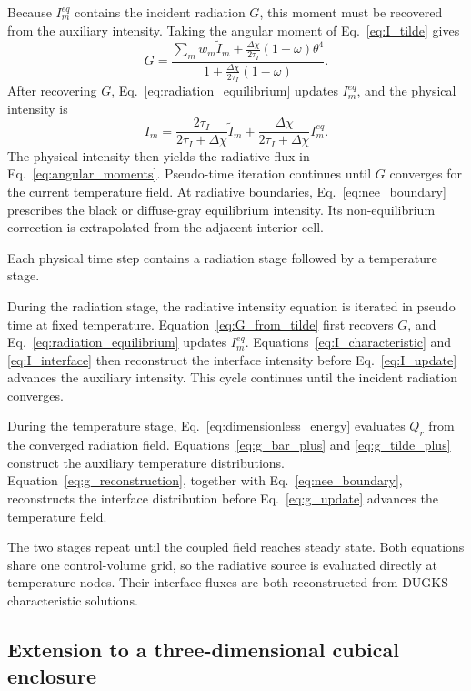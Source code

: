 \documentclass[a4paper,12pt]{ctexart}
\numberwithin{equation}{section}
\begin{document}
Because $I_m^{eq}$ contains the incident radiation $G$, this moment must be recovered from the auxiliary intensity. Taking the angular moment of Eq.~\eqref{eq:I_tilde} gives
\begin{equation}
G=\frac{\sum_m w_m\tilde I_m+\frac{\Delta\chi}{2\tau_I}(1-\omega)\theta^4}
{1+\frac{\Delta\chi}{2\tau_I}(1-\omega)}.
\label{eq:G_from_tilde}
\end{equation}
After recovering $G$, Eq.~\eqref{eq:radiation_equilibrium} updates $I_m^{eq}$, and the physical intensity is
\begin{equation*}
I_m=\frac{2\tau_I}{2\tau_I+\Delta\chi}\tilde I_m+\frac{\Delta\chi}{2\tau_I+\Delta\chi}I_m^{eq}.
\end{equation*}
The physical intensity then yields the radiative flux in Eq.~\eqref{eq:angular_moments}. Pseudo-time iteration continues until $G$ converges for the current temperature field. At radiative boundaries, Eq.~\eqref{eq:nee_boundary} prescribes the black or diffuse-gray equilibrium intensity. Its non-equilibrium correction is extrapolated from the adjacent interior cell.

Each physical time step contains a radiation stage followed by a temperature stage.

During the radiation stage, the radiative intensity equation is iterated in pseudo time at fixed temperature. Equation~\eqref{eq:G_from_tilde} first recovers $G$, and Eq.~\eqref{eq:radiation_equilibrium} updates $I_m^{eq}$. Equations~\eqref{eq:I_characteristic} and \eqref{eq:I_interface} then reconstruct the interface intensity before Eq.~\eqref{eq:I_update} advances the auxiliary intensity. This cycle continues until the incident radiation converges.

During the temperature stage, Eq.~\eqref{eq:dimensionless_energy} evaluates $Q_r$ from the converged radiation field. Equations~\eqref{eq:g_bar_plus} and \eqref{eq:g_tilde_plus} construct the auxiliary temperature distributions. Equation~\eqref{eq:g_reconstruction}, together with Eq.~\eqref{eq:nee_boundary}, reconstructs the interface distribution before Eq.~\eqref{eq:g_update} advances the temperature field.

The two stages repeat until the coupled field reaches steady state. Both equations share one control-volume grid, so the radiative source is evaluated directly at temperature nodes. Their interface fluxes are both reconstructed from DUGKS characteristic solutions.

\subsection{Extension to a three-dimensional cubical enclosure}
\label{subsec:three_dimensional_extension}
\end{document}
